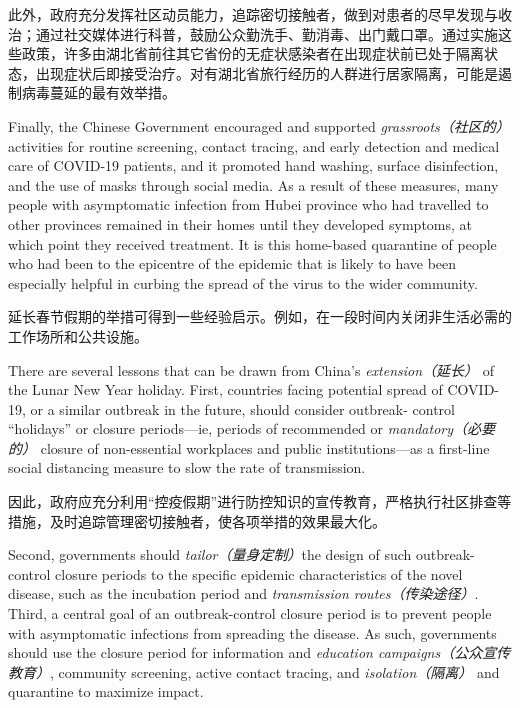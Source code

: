 \begin{multicols}{3}
此外，政府充分发挥社区动员能力，追踪密切接触者，做到对患者的尽早发现与收治；通过社交媒体进行科普，鼓励公众勤洗手、勤消毒、出门戴口罩。通过实施这些政策，许多由湖北省前往其它省份的无症状感染者在出现症状前已处于隔离状态，出现症状后即接受治疗。对有湖北省旅行经历的人群进行居家隔离，可能是遏制病毒蔓延的最有效举措。

Finally, the Chinese Government encouraged and supported\textit{ grassroots（社区的） }activities for routine screening, contact tracing, and early detection and medical care of COVID-19 patients, and it promoted hand washing, surface disinfection, and the use of masks through social media. As a result of these measures, many people with asymptomatic infection from Hubei province who had travelled to other provinces remained in their homes until they developed symptoms, at which point they received treatment. It is this home-based quarantine of people who had been to the epicentre of the epidemic that is likely to have been especially helpful in curbing the spread of the virus to the wider community.

延长春节假期的举措可得到一些经验启示。例如，在一段时间内关闭非生活必需的工作场所和公共设施。

There are several lessons that can be drawn from China's \textit{extension（延长） }of the Lunar New Year holiday. First, countries facing potential spread of COVID-19, or a similar outbreak in the future, should consider outbreak- control ``holidays'' or closure periods---ie, periods of recommended or \textit{mandatory（必要的） }closure of non-essential workplaces and public institutions---as a first-line social distancing measure to slow the rate of transmission. 

因此，政府应充分利用``控疫假期''进行防控知识的宣传教育，严格执行社区排查等措施，及时追踪管理密切接触者，使各项举措的效果最大化。

Second, governments should \textit{tailor（量身定制）}the design of such outbreak-control closure periods to the specific epidemic characteristics of the novel disease, such as the incubation period and\textit{ transmission routes（传染途径）}. Third, a central goal of an outbreak-control closure period is to prevent people with asymptomatic infections from spreading the disease. As such, governments should use the closure period for information and\textit{ education campaigns（公众宣传教育）}, community screening, active contact tracing, and\textit{ isolation（隔离） }and quarantine to maximize impact.


\end{multicols}
